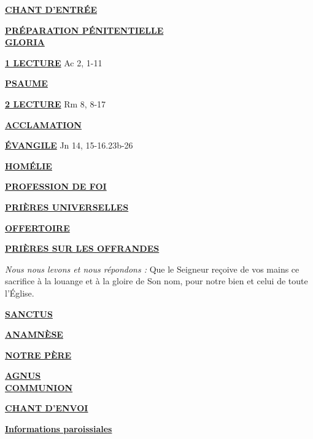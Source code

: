 \documentclass[11pt,a4paper]{article}
\newcommand*{\chants}{../chants}
\newcommand*{\messe}{../messe_bienveillance}
\newcommand*{\pu}{../pu}
\newcommand*{\psaumes}{../psaumes}
\newcommand{\NewsItem}[1]{%
\vspace{3pt}
\underline{\textbf{#1}}
		  }
\begin{document}
\NewsItem{CHANT D'ENTRÉE}
	
\NewsItem{PRÉPARATION PÉNITENTIELLE} \\
	

\NewsItem{GLORIA}
	


\NewsItem{1\iere{} LECTURE} Ac 2, 1-11

\NewsItem{PSAUME}


\NewsItem{2\ieme{} LECTURE} Rm 8, 8-17

\NewsItem{ACCLAMATION}


\NewsItem{ÉVANGILE} Jn 14, 15-16.23b-26 

\NewsItem{HOMÉLIE}

\NewsItem{PROFESSION DE FOI}


\NewsItem{PRIÈRES UNIVERSELLES} 


\NewsItem{OFFERTOIRE}

\NewsItem{PRIÈRES SUR LES OFFRANDES}
\textit{Nous nous levons et nous répondons : }
Que le Seigneur reçoive de vos mains ce sacrifice à la louange et à la gloire 
de Son nom, pour notre bien et celui de toute l’Église.

\NewsItem{SANCTUS}


\NewsItem{ANAMNÈSE}


\NewsItem{NOTRE PÈRE}

\NewsItem{AGNUS} \\


\NewsItem{COMMUNION}


\newpage

\NewsItem{CHANT D'ENVOI}





\NewsItem{Informations paroissiales}
\end{document}
